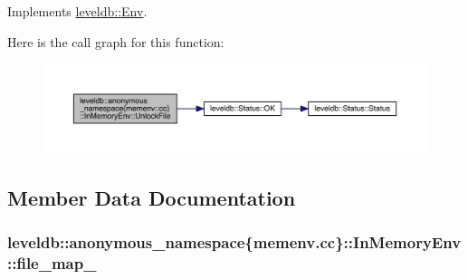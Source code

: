 Implements \hyperlink{classleveldb_1_1_env_a194a2ee3c21bc0b204ad0e5bc3b81d4b}{leveldb\+::\+Env}.



Here is the call graph for this function\+:
\nopagebreak
\begin{figure}[H]
\begin{center}
\leavevmode
\includegraphics[width=350pt]{classleveldb_1_1anonymous__namespace_02memenv_8cc_03_1_1_in_memory_env_a21674a1916bdbfc999ccf26fbf43574e_cgraph}
\end{center}
\end{figure}




\subsection{Member Data Documentation}
\hypertarget{classleveldb_1_1anonymous__namespace_02memenv_8cc_03_1_1_in_memory_env_ae59bafc551305307a2af0658290eea04}{}
\subsubsection[{file\+\_\+map\+\_\+}]{ leveldb\+::anonymous\+\_\+namespace\{memenv.\+cc\}\+::In\+Memory\+Env\+::file\+\_\+map\+\_\+\hspace{0.3cm}{\ttfamily [private]}}\label{classleveldb_1_1anonymous__namespace_02memenv_8cc_03_1_1_in_memory_env_ae59bafc551305307a2af0658290eea04}
\hypertarget{classleveldb_1_1anonymous__namespace_02memenv_8cc_03_1_1_in_memory_env_ae70efa79fc801940537e4f31cec193ad}{}
